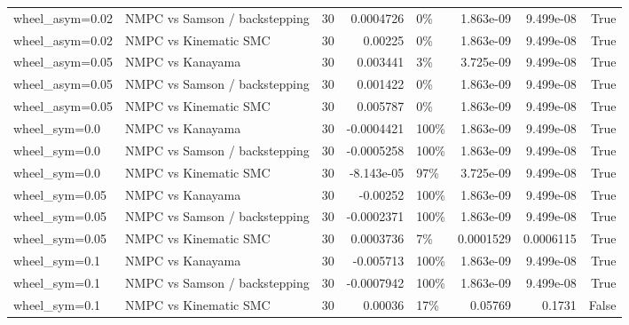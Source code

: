 \begin{table}
\begin{tabular}{llrrlrrr}
wheel\_asym=0.02 & NMPC vs Samson / backstepping & 30 & 0.0004726 & 0\% & 1.863e-09 & 9.499e-08 & True \\
wheel\_asym=0.02 & NMPC vs Kinematic SMC & 30 & 0.00225 & 0\% & 1.863e-09 & 9.499e-08 & True \\
wheel\_asym=0.05 & NMPC vs Kanayama & 30 & 0.003441 & 3\% & 3.725e-09 & 9.499e-08 & True \\
wheel\_asym=0.05 & NMPC vs Samson / backstepping & 30 & 0.001422 & 0\% & 1.863e-09 & 9.499e-08 & True \\
wheel\_asym=0.05 & NMPC vs Kinematic SMC & 30 & 0.005787 & 0\% & 1.863e-09 & 9.499e-08 & True \\
wheel\_sym=0.0 & NMPC vs Kanayama & 30 & -0.0004421 & 100\% & 1.863e-09 & 9.499e-08 & True \\
wheel\_sym=0.0 & NMPC vs Samson / backstepping & 30 & -0.0005258 & 100\% & 1.863e-09 & 9.499e-08 & True \\
wheel\_sym=0.0 & NMPC vs Kinematic SMC & 30 & -8.143e-05 & 97\% & 3.725e-09 & 9.499e-08 & True \\
wheel\_sym=0.05 & NMPC vs Kanayama & 30 & -0.00252 & 100\% & 1.863e-09 & 9.499e-08 & True \\
wheel\_sym=0.05 & NMPC vs Samson / backstepping & 30 & -0.0002371 & 100\% & 1.863e-09 & 9.499e-08 & True \\
wheel\_sym=0.05 & NMPC vs Kinematic SMC & 30 & 0.0003736 & 7\% & 0.0001529 & 0.0006115 & True \\
wheel\_sym=0.1 & NMPC vs Kanayama & 30 & -0.005713 & 100\% & 1.863e-09 & 9.499e-08 & True \\
wheel\_sym=0.1 & NMPC vs Samson / backstepping & 30 & -0.0007942 & 100\% & 1.863e-09 & 9.499e-08 & True \\
wheel\_sym=0.1 & NMPC vs Kinematic SMC & 30 & 0.00036 & 17\% & 0.05769 & 0.1731 & False \\
\bottomrule
\end{tabular}
\end{table}
